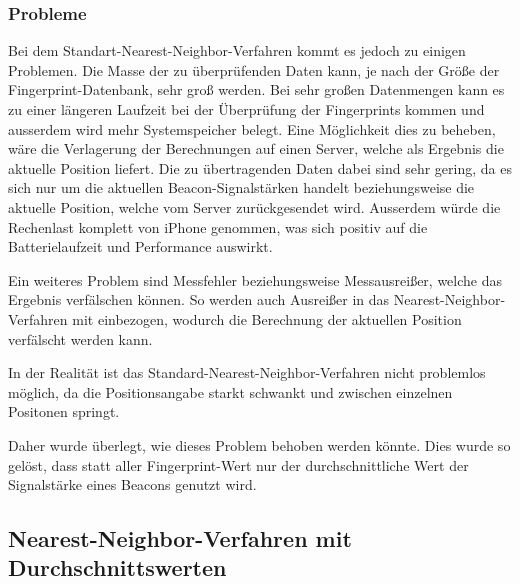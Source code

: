 \subsubsection{Probleme}
\label{sec:implementation:fingerprinting:positioning:naiv:problems}
Bei dem Standart-Nearest-Neighbor-Verfahren kommt es jedoch zu einigen Problemen. 
Die Masse der zu überprüfenden Daten kann, je nach der Größe der Fingerprint-Datenbank, sehr groß werden. Bei sehr großen Datenmengen kann es zu einer längeren Laufzeit bei der Überprüfung der Fingerprints kommen und ausserdem wird mehr Systemspeicher belegt. 
Eine Möglichkeit dies zu beheben, wäre die Verlagerung der Berechnungen auf einen Server, welche als Ergebnis die aktuelle Position liefert. Die zu übertragenden Daten dabei sind sehr gering, da es sich nur um die aktuellen Beacon-Signalstärken handelt beziehungsweise die aktuelle Position, welche vom Server zurückgesendet wird. 
Ausserdem würde die Rechenlast komplett von iPhone genommen, was sich positiv auf die Batterielaufzeit und Performance auswirkt.

Ein weiteres Problem sind Messfehler beziehungsweise Messausreißer, welche das Ergebnis verfälschen können. So werden auch Ausreißer in das Nearest-Neighbor-Verfahren mit einbezogen, wodurch die Berechnung der aktuellen Position verfälscht werden kann.

In der Realität ist das Standard-Nearest-Neighbor-Verfahren nicht problemlos möglich, da die Positionsangabe starkt schwankt und zwischen einzelnen Positonen springt.

Daher wurde überlegt, wie dieses Problem behoben werden könnte. Dies wurde so gelöst, dass statt aller Fingerprint-Wert nur der durchschnittliche Wert der Signalstärke eines Beacons genutzt wird.


\subsection{Nearest-Neighbor-Verfahren mit Durchschnittswerten}
\label{sec:implementation:fingerprinting:positioning:avg}


